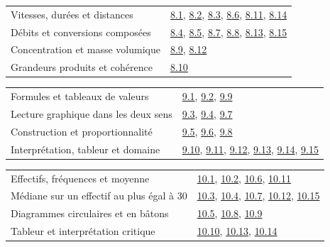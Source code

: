 \begin{tabularx}{\linewidth}{@{}Yl@{}}\toprule
Vitesses, durées et distances & \hyperref[exo-8-1]{8.1}, \hyperref[exo-8-2]{8.2}, \hyperref[exo-8-3]{8.3}, \hyperref[exo-8-6]{8.6}, \hyperref[exo-8-11]{8.11}, \hyperref[exo-8-14]{8.14}\\[2mm]
Débits et conversions composées & \hyperref[exo-8-4]{8.4}, \hyperref[exo-8-5]{8.5}, \hyperref[exo-8-7]{8.7}, \hyperref[exo-8-8]{8.8}, \hyperref[exo-8-13]{8.13}, \hyperref[exo-8-15]{8.15}\\[2mm]
Concentration et masse volumique & \hyperref[exo-8-9]{8.9}, \hyperref[exo-8-12]{8.12}\\[2mm]
Grandeurs produits et cohérence & \hyperref[exo-8-10]{8.10}\\[2mm]
\bottomrule\end{tabularx}\par\vspace{4mm}
\begin{tabularx}{\linewidth}{@{}Yl@{}}\toprule
Formules et tableaux de valeurs & \hyperref[exo-9-1]{9.1}, \hyperref[exo-9-2]{9.2}, \hyperref[exo-9-9]{9.9}\\[2mm]
Lecture graphique dans les deux sens & \hyperref[exo-9-3]{9.3}, \hyperref[exo-9-4]{9.4}, \hyperref[exo-9-7]{9.7}\\[2mm]
Construction et proportionnalité & \hyperref[exo-9-5]{9.5}, \hyperref[exo-9-6]{9.6}, \hyperref[exo-9-8]{9.8}\\[2mm]
Interprétation, tableur et domaine & \hyperref[exo-9-10]{9.10}, \hyperref[exo-9-11]{9.11}, \hyperref[exo-9-12]{9.12}, \hyperref[exo-9-13]{9.13}, \hyperref[exo-9-14]{9.14}, \hyperref[exo-9-15]{9.15}\\[2mm]
\bottomrule\end{tabularx}\par\vspace{4mm}
\clearpage
{}\fontsize{10}{13}\selectfont
{}\begin{tabularx}{\linewidth}{@{}Yl@{}}\toprule
Effectifs, fréquences et moyenne & \hyperref[exo-10-1]{10.1}, \hyperref[exo-10-2]{10.2}, \hyperref[exo-10-6]{10.6}, \hyperref[exo-10-11]{10.11}\\[2mm]
Médiane sur un effectif au plus égal à 30 & \hyperref[exo-10-3]{10.3}, \hyperref[exo-10-4]{10.4}, \hyperref[exo-10-7]{10.7}, \hyperref[exo-10-12]{10.12}, \hyperref[exo-10-15]{10.15}\\[2mm]
Diagrammes circulaires et en bâtons & \hyperref[exo-10-5]{10.5}, \hyperref[exo-10-8]{10.8}, \hyperref[exo-10-9]{10.9}\\[2mm]
Tableur et interprétation critique & \hyperref[exo-10-10]{10.10}, \hyperref[exo-10-13]{10.13}, \hyperref[exo-10-14]{10.14}\\[2mm]
\bottomrule\end{tabularx}\par\vspace{4mm}
